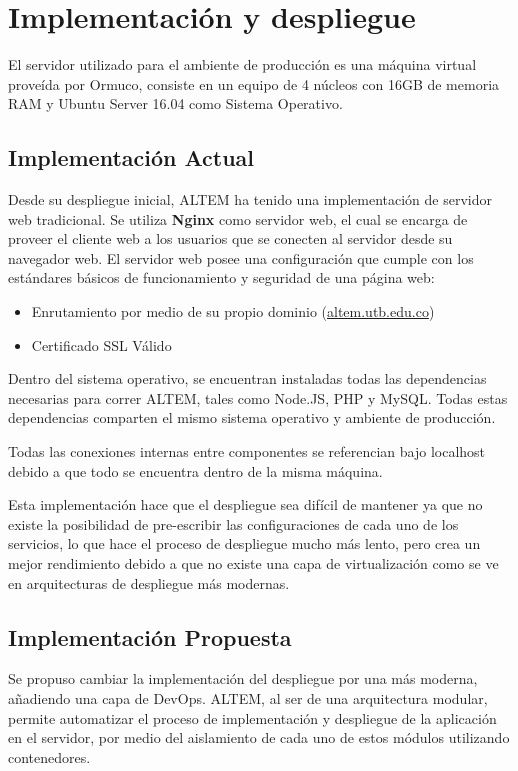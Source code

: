 \chapter{Implementación y despliegue}
El servidor utilizado para el ambiente de producción es una máquina virtual proveída por Ormuco, consiste en un equipo de 4 núcleos con 16GB de memoria RAM y Ubuntu Server 16.04 como Sistema Operativo. 

\section{Implementación Actual}
Desde su despliegue inicial, ALTEM ha tenido una implementación de servidor web tradicional. Se utiliza \textbf{Nginx} como servidor web, el cual se encarga de proveer el cliente web a los usuarios que se conecten al servidor desde su navegador web.
El servidor web posee una configuración que cumple con los estándares básicos de funcionamiento y seguridad de una página web:

\begin{itemize}
    \item Enrutamiento por medio de su propio dominio (\url{altem.utb.edu.co})
    \item Certificado SSL Válido
\end{itemize}

Dentro del sistema operativo, se encuentran instaladas todas las dependencias necesarias para correr ALTEM, tales como Node.JS, PHP y MySQL. Todas estas dependencias comparten el mismo sistema operativo y ambiente de producción. 

Todas las conexiones internas entre componentes se referencian bajo localhost debido a que todo se encuentra dentro de la misma máquina.

Esta implementación hace que el despliegue sea difícil de mantener ya que no existe la posibilidad de pre-escribir las configuraciones de cada uno de los servicios, lo que hace el proceso de despliegue mucho más lento, pero crea un mejor rendimiento debido a que no existe una capa de virtualización como se ve en arquitecturas de despliegue más modernas.

\section{Implementación Propuesta}
Se propuso cambiar la implementación del despliegue por una más moderna, añadiendo una capa de DevOps.
ALTEM, al ser de una arquitectura modular, permite automatizar el proceso de implementación y despliegue de la aplicación en el servidor, por medio del aislamiento de cada uno de estos módulos utilizando contenedores.

